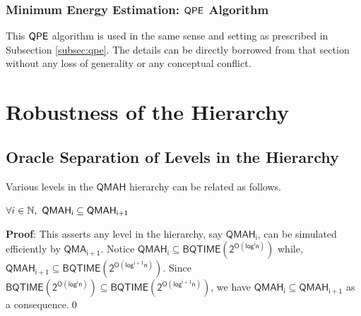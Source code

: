 \documentclass[11pt]{article}
\newcommand{\ms}[1]{\mathsf{#1}}
\begin{document}
\subsubsection{Minimum Energy Estimation: $\mathsf{QPE}$ Algorithm}\label{subsec:patent-3}
This $\mathsf{QPE}$ algorithm is used in the same sense and setting as prescribed in Subsection \ref{subsec:qpe}. The details can be directly borrowed from that section without any loss of generality or any conceptual conflict.





\section{Robustness of the Hierarchy}\label{sec: oracle-separatoion}
\subsection{Oracle Separation of Levels in the Hierarchy}
Various levels in the $\ms{QMAH}$ hierarchy can be related as follows.
\begin{theorem}
    $\forall i\in \N,\ \ms{QMAH_i}\subseteq  \ms{QMAH_{i+1}}$
\end{theorem}
\textbf{Proof}: This asserts any level in the hierarchy, say $\ms{QMAH_i}$, can be simulated efficiently by $\ms{QMA_{i+1}}$. Notice $\ms{QMAH_i\subseteq BQTIME(2^{O(log^i n)})}$ while, $\ms{QMAH_{i+1}\subseteq BQTIME(2^{O(log^{i+1} n)})}$. Since $\ms{BQTIME(2^{O(log^i n)})\subseteq BQTIME(2^{O(log^{i+1} n)})}$, we have $\ms{QMAH_i\subseteq QMAH_{i+1}}$ as a consequence.\qed
\end{document}
